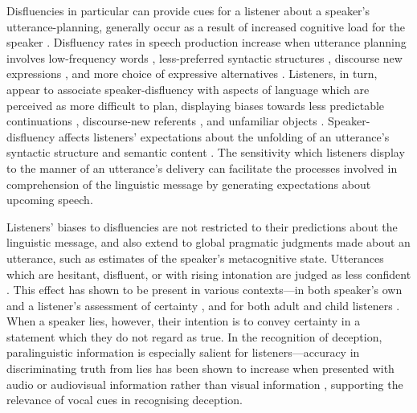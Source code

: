 \documentclass[man]{apa6}
\begin{document}
Disfluencies in particular can provide cues for a listener about a speaker's utterance-planning, generally occur as a result of increased cognitive load for the speaker \citep{Bortfeld2001, Goldman-Eisler1968}. 
Disfluency rates in speech production increase when utterance planning involves low-frequency words \citep{Beattie1979}, less-preferred syntactic structures \citep{Cook2009}, discourse new expressions \citep{Arnold2003}, and more choice of expressive alternatives \citep{Schachter1991}. 
Listeners, in turn, appear to associate speaker-disfluency with aspects of language which are perceived as more difficult to plan, displaying biases towards less predictable continuations \citep{Corley2007}, discourse-new referents \citep{Barr2001, Arnold2004}, and unfamiliar objects \citep{Arnold2007}.
Speaker-disfluency affects listeners' expectations about the unfolding of an utterance's syntactic structure \citep{Ferreira2004a, Lau2005} and semantic content \citep{Barr2001, Arnold2003, Arnold2004}. 
The sensitivity which listeners display to the manner of an utterance's delivery can facilitate the processes involved in comprehension of the linguistic message by generating expectations about upcoming speech.


Listeners' biases to disfluencies are not restricted to their predictions about the linguistic message, and also extend to global pragmatic judgments made about an utterance, such as estimates of the speaker's metacognitive state.
Utterances which are hesitant, disfluent, or with rising intonation are judged as less confident \citep{Smith1993, Brennan1995}.
This effect has shown to be present in various contexts---in both speaker's own and a listener's assessment of certainty \citep{Swerts2005}, and for both adult and child listeners \citep{Krahmer2005}.\\
When a speaker lies, however, their intention is to convey certainty in a statement which they do not regard as true. 
In the recognition of deception, paralinguistic information is especially salient for listeners---accuracy in discriminating truth from lies has been shown to increase when presented with audio or audiovisual information rather than visual information \citep{Bond2006}, supporting the relevance of vocal cues in recognising deception.\\
\end{document}
